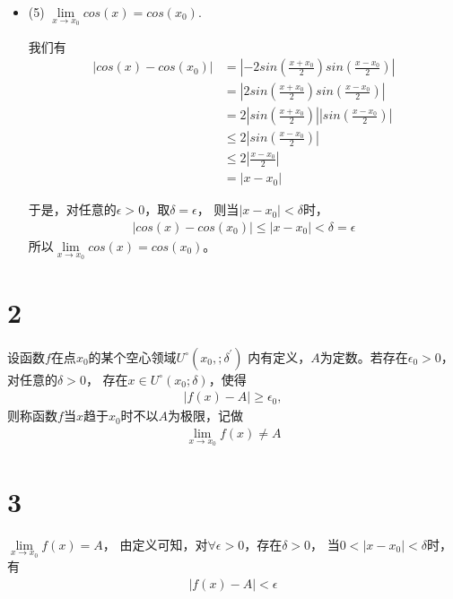 \documentclass{article}
\begin{document}
\begin{itemize}
  \item (5) $\lim\limits_{x \to x_0} cos(x) = cos(x_0)$.

        我们有
        \begin{align*}
          |cos(x) - cos(x_0)|
           & = |-2sin(\frac{x + x_0}{2})sin(\frac{x - x_0}{2})|   \\
           & = |2sin(\frac{x + x_0}{2})sin(\frac{x - x_0}{2})|    \\
           & = 2 |sin(\frac{x + x_0}{2})||sin(\frac{x - x_0}{2})| \\
           & \leq 2|sin(\frac{x - x_0}{2})|                       \\
           & \leq 2|\frac{x - x_0}{2}|                            \\
           & = |x - x_0|
        \end{align*}

        于是，对任意的$\epsilon > 0$，取$\delta = \epsilon$，
        则当$|x - x_0| < \delta$时，
        \begin{align*}
          |cos(x) - cos(x_0)| \leq |x - x_0| < \delta = \epsilon
        \end{align*}
        所以$\lim\limits_{x \to x_0} cos(x) = cos(x_0)$。

\end{itemize}

\section*{2}

设函数$f$在点$x_0$的某个空心领域$U^{\circ}(x_0,; \delta^\prime)$
内有定义，$A$为定数。若存在$\epsilon_0 > 0$，对任意的$\delta > 0$，
存在$x \in U^{\circ}(x_0; \delta)$，使得
\begin{align*}
  |f(x) - A| \geq \epsilon_0,
\end{align*}
则称函数$f$当$x$趋于$x_0$时不以$A$为极限，记做
\begin{align*}
  \lim_{x \to x_0} f(x) \neq A
\end{align*}

\section*{3}

$\lim\limits_{x \to x_0} f(x) = A$，
由定义可知，对$\forall \epsilon > 0$，存在$\delta > 0$，
当$0 < |x - x_0| < \delta$时，有
\begin{align*}
  |f(x) - A| < \epsilon
\end{align*}
\end{document}
